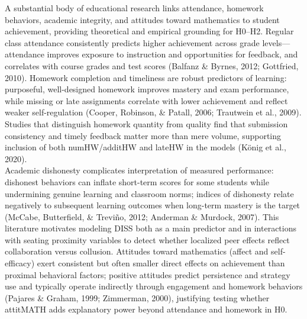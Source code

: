 \documentclass[]{article}
\begin{document}
	
	A substantial body of educational research links attendance, homework behaviors, academic integrity, and attitudes toward mathematics to student achievement, providing theoretical and empirical grounding for H0–H2. Regular class attendance consistently predicts higher achievement across grade levels—attendance improves exposure to instruction and opportunities for feedback, and correlates with course grades and test scores (Balfanz \& Byrnes, 2012; Gottfried, 2010). Homework completion and timeliness are robust predictors of learning: purposeful, well-designed homework improves mastery and exam performance, while missing or late assignments correlate with lower achievement and reflect weaker self-regulation (Cooper, Robinson, \& Patall, 2006; Trautwein et al., 2009). Studies that distinguish homework quantity from quality find that submission consistency and timely feedback matter more than mere volume, supporting inclusion of both numHW/additHW and lateHW in the models (König et al., 2020).\\
	
	Academic dishonesty complicates interpretation of measured performance: dishonest behaviors can inflate short-term scores for some students while undermining genuine learning and classroom norms; indices of dishonesty relate negatively to subsequent learning outcomes when long-term mastery is the target (McCabe, Butterfield, \& Treviño, 2012; Anderman \& Murdock, 2007). This literature motivates modeling DISS both as a main predictor and in interactions with seating proximity variables to detect whether localized peer effects reflect collaboration versus collusion. Attitudes toward mathematics (affect and self-efficacy) exert consistent but often smaller direct effects on achievement than proximal behavioral factors; positive attitudes predict persistence and strategy use and typically operate indirectly through engagement and homework behaviors (Pajares \& Graham, 1999; Zimmerman, 2000), justifying testing whether attitMATH adds explanatory power beyond attendance and homework in H0.\\
	
\end{document}
